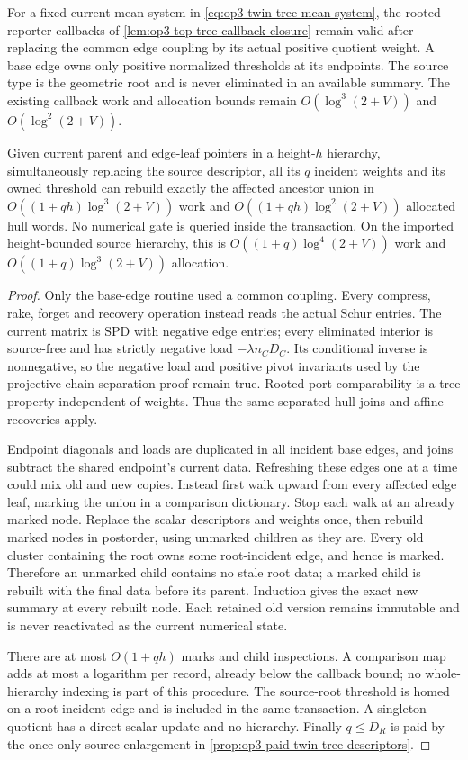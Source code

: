 \begin{lemma}
\label{lem:op3-weighted-twin-tree-callbacks}
For a fixed current mean system in \eqref{eq:op3-twin-tree-mean-system},
the rooted reporter callbacks of \cref{lem:op3-top-tree-callback-closure}
remain valid after replacing the common edge coupling by its actual
positive quotient weight. A base edge owns only positive normalized
thresholds at its endpoints. The source type is the geometric root and
is never eliminated in an available summary. The existing callback work
and allocation bounds remain $O(\log^3(2+V))$ and $O(\log^2(2+V))$.

Given current parent and edge-leaf pointers in a height-$h$ hierarchy,
simultaneously replacing the source descriptor, all its $q$ incident
weights and its owned threshold can rebuild exactly the affected
ancestor union in $O((1+qh)\log^3(2+V))$ work and
$O((1+qh)\log^2(2+V))$ allocated hull words. No numerical gate is queried
inside the transaction. On the imported height-bounded source hierarchy,
this is $O((1+q)\log^4(2+V))$ work and
$O((1+q)\log^3(2+V))$ allocation.
\end{lemma}
\begin{proof}
Only the base-edge routine used a common coupling. Every compress,
rake, forget and recovery operation instead reads the actual Schur
entries. The current matrix is SPD with negative edge entries; every
eliminated interior is source-free and has strictly negative load
$-\lambda n_CD_C$. Its conditional inverse is nonnegative, so the negative
load and positive pivot invariants used by the projective-chain separation
proof remain true. Rooted port comparability is a tree property independent
of weights. Thus the same separated hull joins and affine recoveries apply.

Endpoint diagonals and loads are duplicated in all incident base edges,
and joins subtract the shared endpoint's current data. Refreshing these
edges one at a time could mix old and new copies. Instead first walk upward
from every affected edge leaf, marking the union in a comparison dictionary.
Stop each walk at an already marked node. Replace the scalar descriptors
and weights once, then rebuild marked nodes in postorder, using unmarked
children as they are. Every old cluster containing the root owns some
root-incident edge, and hence is marked. Therefore an unmarked child
contains no stale root data; a marked child is rebuilt with the final data
before its parent. Induction gives the exact new summary at every rebuilt
node. Each retained old version remains immutable and is never reactivated
as the current numerical state.

There are at most $O(1+qh)$ marks and child inspections. A comparison map
adds at most a logarithm per record, already below the callback bound;
no whole-hierarchy indexing is part of this procedure. The source-root
threshold is homed on a root-incident edge and is included in the same
transaction. A singleton quotient has a direct scalar update and no
hierarchy. Finally $q\leq D_R$ is paid by the once-only source enlargement
in \cref{prop:op3-paid-twin-tree-descriptors}.
\end{proof}

